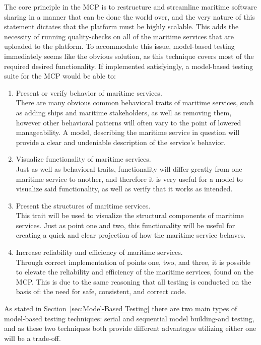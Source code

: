 The core principle in the MCP is to restructure and streamline maritime software sharing in a manner that can be done the world over, and the very nature of this statement dictates that the platform must be highly scalable. This adds the necessity of running quality-checks on all of the maritime services that are uploaded to the platform. To accommodate this issue, model-based testing immediately seems like the obvious solution, as this technique covers most of the required desired functionality. If implemented satisfyingly, a model-based testing suite for the MCP would be able to:
\begin{enumerate}
  \item Present or verify behavior of maritime services.\\
    There are many obvious common behavioral traits of maritime services, such as adding ships and maritime stakeholders, as well as removing them, however other behavioral patterns will often vary to the point of lowered manageability. A model, describing the maritime service in question will provide a clear and undeniable description of the service's behavior.\newpage
  \item Visualize functionality of maritime services.\\
    Just as well as behavioral traits, functionality will differ greatly from one maritime service to another, and therefore it is very useful for a model to visualize said functionality, as well as verify that it works as intended.
  \item Present the structures of maritime services.\\
    This trait will be used to visualize the structural components of maritime services. Just as point one and two, this functionality will be useful for creating a quick and clear projection of how the maritime service behaves.
  \item Increase reliability and efficiency of maritime services.\\
    Through correct implementation of points one, two, and three, it is possible to elevate the reliability and efficiency of the maritime services, found on the MCP. This is due to the same reasoning that all testing is conducted on the basis of: the need for safe, consistent, and correct code.
\end{enumerate}
\noindent
As stated in Section~\ref{sec:Model-Based Testing} there are two main types of model-based testing techniques: serial and sequential model building-and testing, and as these two techniques both provide different advantages utilizing either one will be a trade-off.\newpage

